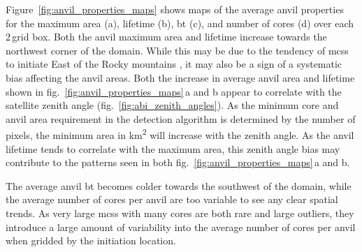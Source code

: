 Figure~\ref{fig:anvil_properties_maps} shows maps of the average anvil properties for the maximum area (a), lifetime (b), \acrshort{bt} (c), and number of cores (d) over each 2\,\textdegree grid box.
Both the anvil maximum area and lifetime increase towards the northwest corner of the domain.
While this may be due to the tendency of \acrshort{mcs}s to initiate East of the Rocky mountains \citep{feng_spatiotemporal_2019}, it may also be a sign of a systematic bias affecting the anvil areas.
Both the increase in average anvil area and lifetime shown in fig.~\ref{fig:anvil_properties_maps}\,a and b appear to correlate with the satellite zenith angle (fig.~\ref{fig:abi_zenith_angles}).
As the minimum core and anvil area requirement in the detection algorithm is determined by the number of pixels, the minimum area in \unit{km^2} will increase with the zenith angle.
As the anvil lifetime tends to correlate with the maximum area, this zenith angle bias may contribute to the patterns seen in both fig.~\ref{fig:anvil_properties_maps}\,a and b.

The average anvil \acrshort{bt} becomes colder towards the southwest of the domain, while the average number of cores per anvil are too variable to see any clear spatial trends.
As very large \acrshort{mcs}s with many cores are both rare and large outliers, they introduce a large amount of variability into the average number of cores per anvil when gridded by the initiation location.



